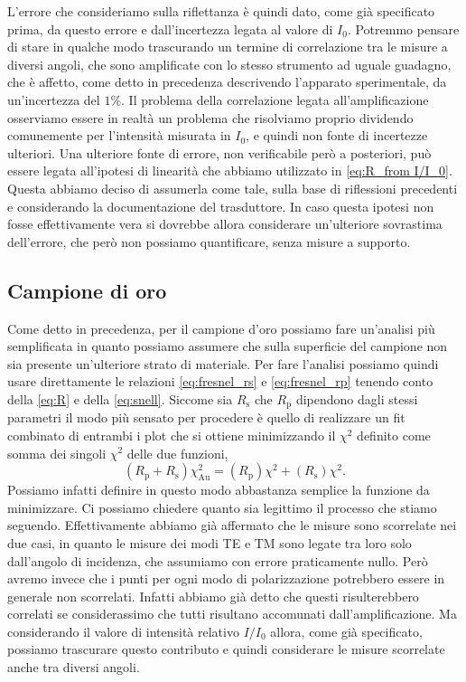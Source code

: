 \documentclass[
    prb,altaffilletter,citeautoscript,
    amsmath,amssymb,
    showpacs,showkeys,floatfix,
    reprint
]{revtex4-1}
\begin{document}
L'errore che consideriamo sulla riflettanza è quindi dato, come già specificato prima, da questo errore e dall'incertezza legata al valore di $I_0$. Potremmo pensare di stare in qualche modo trascurando un termine di correlazione tra le misure a diversi angoli, che sono amplificate con lo stesso strumento ad uguale guadagno, che è affetto, come detto in precedenza descrivendo l'apparato sperimentale, da un'incertezza del $1\%$. Il problema della correlazione legata all'amplificazione osserviamo essere in realtà un problema che risolviamo proprio dividendo comunemente per l'intensità misurata in $I_0$, e quindi non fonte di incertezze ulteriori. Una ulteriore fonte di errore, non verificabile però a posteriori, può essere legata all'ipotesi di linearità che abbiamo utilizzato in \eqref{eq:R_from I/I_0}. Questa abbiamo deciso di assumerla come tale, sulla base di riflessioni precedenti e considerando la documentazione del trasduttore. In caso questa ipotesi non fosse effettivamente vera si dovrebbe allora considerare un'ulteriore sovrastima dell'errore, che però non possiamo quantificare, senza misure a supporto. 

\subsection{Campione di oro}
Come detto in precedenza, per il campione d'oro possiamo fare un'analisi più semplificata in quanto possiamo assumere che sulla superficie del campione non sia presente un'ulteriore strato di materiale. Per fare l'analisi possiamo quindi usare direttamente le relazioni \eqref{eq:fresnel_rs} e \eqref{eq:fresnel_rp} tenendo conto della \eqref{eq:R} e della \eqref{eq:snell}. Siccome sia $R_\mathrm{s}$ che $R_\mathrm{p}$ dipendono dagli stessi parametri il modo più sensato per procedere è quello di realizzare un fit combinato di entrambi i plot che si ottiene minimizzando il $\chi^2$ definito come somma dei singoli $\chi^2$ delle due funzioni, \begin{equation}
    (R_\mathrm{p} + R_\mathrm{s})\chi^2_\mathrm{Au} = (R_\mathrm{p})\chi^2 + (R_\mathrm{s})\chi^2.
\end{equation} Possiamo infatti definire in questo modo abbastanza semplice la funzione da minimizzare. Ci possiamo chiedere quanto sia legittimo il processo che stiamo seguendo. Effettivamente abbiamo già affermato che le misure sono scorrelate nei due casi, in quanto le misure dei modi TE e TM sono legate tra loro solo dall'angolo di incidenza, che assumiamo con errore praticamente nullo. Però avremo invece che i punti per ogni modo di polarizzazione potrebbero essere in generale non scorrelati. Infatti abbiamo già detto che questi risulterebbero correlati se considerassimo che tutti risultano accomunati dall'amplificazione. Ma considerando il valore di intensità relativo $I/I_0$ allora, come già specificato, possiamo trascurare questo contributo e quindi considerare le misure scorrelate anche tra diversi angoli.
\end{document}
